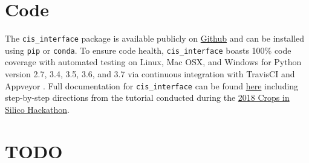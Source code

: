 \documentclass[journal]{IEEEtran}
\newcommand{\todo}[1]{{\color{red}{#1}}}
\newcommand{\cis}{{\tt cis\_interface}{}}
\begin{document}
\section*{Code}\label{S:code}
The {\cis} package is available publicly on \href{https://github.com/cropsinsilico/cis_interface}{Github} and can be 
installed using {\tt pip} or {\tt conda}. To ensure code health, {\cis} boasts 100\% code coverage with automated testing on Linux, Mac OSX, and Windows for Python version 2.7, 3.4, 3.5, 3.6, and 3.7 via continuous integration with TravisCI \citep{travisci} and Appveyor \citep{appveyor}. Full documentation for {\cis} can be found \href{https://cropsinsilico.github.io/cis_interface/}{here} including step-by-step directions from the tutorial conducted during the \href{https://cropsinsilico.github.io/cis_interface/hackathon2018/index.html}{2018 Crops in Silico Hackathon}.

\section*{TODO}
\todo{%
\begin{itemize}
	\item Fix code citations to include URLs
	\item Increase size of font on figures or increase size of figures (depends on iSP format)
	\item Get real in-prep citation from Kavya
	\item Confirm sentence about Yu/Kavya integration for accuracy
	\item Get grant numbers/titles for acknowledgments
	\item Ask Matt what the hardware is for DXL
	\item Add plots that include Matlab results when they finish
	\item Add plots that include Windows results when they finish
\end{itemize}
}

\end{document}
